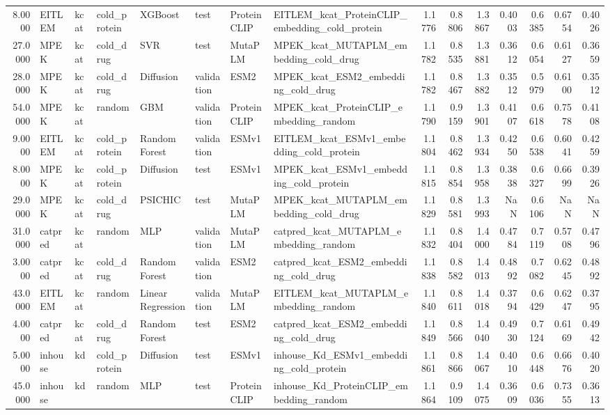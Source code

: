 \begin{tabular}{rlllllllrrrrrrr}
8.0000 & EITLEM & kcat & cold_protein & XGBoost & test & ProteinCLIP & EITLEM_kcat_ProteinCLIP_embedding_cold_protein & 1.1776 & 0.8806 & 1.3867 & 0.4003 & 0.6385 & 0.6754 & 0.4026 \\
27.0000 & MPEK & kcat & cold_drug & SVR & test & MutaPLM & MPEK_kcat_MUTAPLM_embedding_cold_drug & 1.1782 & 0.8535 & 1.3881 & 0.3612 & 0.6054 & 0.6127 & 0.3659 \\
28.0000 & MPEK & kcat & cold_drug & Diffusion & validation & ESM2 & MPEK_kcat_ESM2_embedding_cold_drug & 1.1782 & 0.8467 & 1.3882 & 0.3512 & 0.5979 & 0.6100 & 0.3512 \\
54.0000 & MPEK & kcat & random & GBM & validation & ProteinCLIP & MPEK_kcat_ProteinCLIP_embedding_random & 1.1790 & 0.9159 & 1.3901 & 0.4107 & 0.6618 & 0.7578 & 0.4108 \\
9.0000 & EITLEM & kcat & cold_protein & Random Forest & validation & ESMv1 & EITLEM_kcat_ESMv1_embedding_cold_protein & 1.1804 & 0.8462 & 1.3934 & 0.4250 & 0.6538 & 0.6041 & 0.4259 \\
8.0000 & MPEK & kcat & cold_protein & Diffusion & test & ESMv1 & MPEK_kcat_ESMv1_embedding_cold_protein & 1.1815 & 0.8854 & 1.3958 & 0.3838 & 0.6327 & 0.6699 & 0.3926 \\
29.0000 & MPEK & kcat & cold_drug & PSICHIC & test & MutaPLM & MPEK_kcat_MUTAPLM_embedding_cold_drug & 1.1829 & 0.8581 & 1.3993 & NaN & 0.6106 & NaN & NaN \\
31.0000 & catpred & kcat & random & MLP & validation & MutaPLM & catpred_kcat_MUTAPLM_embedding_random & 1.1832 & 0.8404 & 1.4000 & 0.4784 & 0.7119 & 0.5708 & 0.4796 \\
3.0000 & catpred & kcat & cold_drug & Random Forest & validation & ESM2 & catpred_kcat_ESM2_embedding_cold_drug & 1.1838 & 0.8582 & 1.4013 & 0.4892 & 0.7082 & 0.6245 & 0.4892 \\
43.0000 & EITLEM & kcat & random & Linear Regression & validation & MutaPLM & EITLEM_kcat_MUTAPLM_embedding_random & 1.1840 & 0.8611 & 1.4018 & 0.3794 & 0.6429 & 0.6247 & 0.3795 \\
4.0000 & catpred & kcat & cold_drug & Random Forest & test & ESM2 & catpred_kcat_ESM2_embedding_cold_drug & 1.1849 & 0.8566 & 1.4040 & 0.4930 & 0.7124 & 0.6169 & 0.4942 \\
5.0000 & inhouse & kd & cold_protein & Diffusion & test & ESMv1 & inhouse_Kd_ESMv1_embedding_cold_protein & 1.1861 & 0.8866 & 1.4067 & 0.4010 & 0.6448 & 0.6676 & 0.4020 \\
45.0000 & inhouse & kd & random & MLP & test & ProteinCLIP & inhouse_Kd_ProteinCLIP_embedding_random & 1.1864 & 0.9109 & 1.4075 & 0.3609 & 0.6036 & 0.7355 & 0.3613 \\

\end{tabular}

